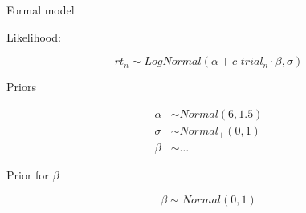 \documentclass[12pt,ignorenonframetext,aspectratio=169]{beamer}
\begin{document}
\begin{frame}{Formal model}
\protect\hypertarget{formal-model-1}{}

\begin{block}{Likelihood:}

\begin{equation}
rt_n \sim LogNormal(\alpha + c\_trial_n \cdot \beta,\sigma)
\label{eq:rtloglik}
\end{equation}

\end{block}

\begin{block}{Priors}

\begin{equation}
\begin{aligned}
\alpha &\sim Normal(6, 1.5) \\
\sigma &\sim Normal_+(0, 1)\\
\beta &\sim \ldots
\end{aligned}
\end{equation}

\end{block}

\end{frame}

\begin{frame}{Prior for \(\beta\)}
\protect\hypertarget{prior-for-beta-1}{}

\begin{equation}
\beta \sim Normal(0, 1)
\end{equation}

\end{frame}
\end{document}
